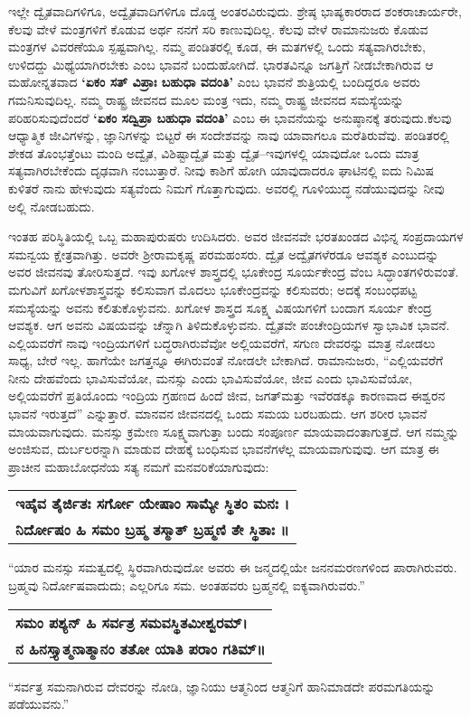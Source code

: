 ಇಲ್ಲೇ ದ್ವೈತವಾದಿಗಳಿಗೂ, ಅದ್ವೈತವಾದಿಗಳಿಗೂ ದೊಡ್ಡ ಅಂತರವಿರುವುದು. ಶ್ರೇಷ್ಠ ಭಾಷ್ಯಕಾರರಾದ ಶಂಕರಾಚಾರ್ಯರೇ, ಕೆಲವು ವೇಳೆ ಮಂತ್ರಗಳಿಗೆ ಕೊಡುವ ಅರ್ಥ ನನಗೆ ಸರಿ ಕಾಣುವುದಿಲ್ಲ. ಕೆಲವು ವೇಳೆ ರಾಮಾನುಜರು ಕೊಡುವ ಮಂತ್ರಗಳ ವಿವರಣೆಯೂ ಸ್ಪಷ್ಟವಾಗಿಲ್ಲ. ನಮ್ಮ ಪಂಡಿತರಲ್ಲಿ ಕೂಡ, ಈ ಮತಗಳಲ್ಲಿ ಒಂದು ಸತ್ಯವಾಗಿರಬೇಕು, ಉಳಿದದ್ದು ಮಿಥ್ಯೆಯಾಗಿರಬೇಕು ಎಂಬ ಭಾವನೆ ಬಂದುಹೋಗಿದೆ. ಭಾರತವಿನ್ನೂ ಜಗತ್ತಿಗೆ ನೀಡಬೇಕಾಗಿರುವ ಆ ಮಹೋನ್ನತವಾದ \textbf{‘ಏಕಂ ಸತ್​ ವಿಪ್ರಾಃ ಬಹುಧಾ ವದಂತಿ’} ಎಂಬ ಭಾವನೆ ಶುತ್ರಿಯಲ್ಲಿ ಬಂದಿದ್ದರೂ ಅವರು ಗಮನಿಸುವುದಿಲ್ಲ. ನಮ್ಮ ರಾಷ್ಟ್ರ ಜೀವನದ ಮೂಲ ಮಂತ್ರ ಇದು, ನಮ್ಮ ರಾಷ್ಟ್ರ ಜೀವನದ ಸಮಸ್ಯೆಯನ್ನು ಪರಿಹರಿಸುವುದೆಂದರೆ \textbf{‘ಏಕಂ ಸದ್ವಿಪ್ರಾ ಬಹುಧಾ ವದಂತಿ’} ಎಂಬ ಈ ಭಾವನೆಯನ್ನು ಅನುಷ್ಠಾನಕ್ಕೆ ತರುವುದು.\break ಕೆಲವು ಆಧ್ಯಾತ್ಮಿಕ ಜೀವಿಗಳನ್ನು, ಜ್ಞಾನಿಗಳನ್ನು ಬಿಟ್ಟರೆ ಈ ಸಂದೇಶವನ್ನು ನಾವು ಯಾವಾ\break ಗಲೂ ಮರೆತಿರುವೆವು. ಪಂಡಿತರಲ್ಲಿ ಶೇಕಡ ತೊಂಭತ್ತೆಂಟು ಮಂದಿ ಅದ್ವೈತ, ವಿಶಿಷ್ಟಾದ್ವೈತ ಮತ್ತು ದ್ವೈತ–ಇವುಗಳಲ್ಲಿ ಯಾವುದೋ ಒಂದು ಮಾತ್ರ ಸತ್ಯವಾಗಿರಬೇಕೆಂದು ದೃಢವಾಗಿ ನಂಬುತ್ತಾರೆ. ನೀವು ಕಾಶಿಗೆ ಹೋಗಿ ಯಾವುದಾದರೂ ಘಾಟಿನಲ್ಲಿ ಐದು ನಿಮಿಷ ಕುಳಿತರೆ ನಾನು ಹೇಳುವುದು ಸತ್ಯವೆಂದು ನಿಮಗೆ ಗೊತ್ತಾಗುವುದು. ಅವರಲ್ಲಿ ಗೂಳಿಯುದ್ಧ ನಡೆಯುವುದನ್ನು ನೀವು ಅಲ್ಲಿ ನೋಡಬಹುದು.

ಇಂತಹ ಪರಿಸ್ಥಿತಿಯಲ್ಲಿ ಒಬ್ಬ ಮಹಾಪುರುಷರು ಉದಿಸಿದರು. ಅವರ ಜೀವನವೇ ಭರತಖಂಡದ ವಿಭಿನ್ನ ಸಂಪ್ರದಾಯಗಳ ಸಮನ್ವಯ ಕ್ಷೇತ್ರವಾಗಿತ್ತು. ಅವರೇ ಶ‍್ರೀರಾಮಕೃಷ್ಣ ಪರಮಹಂಸರು. ದ್ವೈತ ಅದ್ವೈತಗಳೆರಡೂ ಆವಶ್ಯಕ ಎಂಬುದನ್ನು ಅವರ ಜೀವನವು ತೋರಿಸುತ್ತದೆ. ಇವು ಖಗೋಳ ಶಾಸ್ತ್ರದಲ್ಲಿ ಭೂಕೇಂದ್ರ  ಸೂರ್ಯಕೇಂದ್ರ  ವೆಂಬ ಸಿದ್ಧಾಂತಗಳಿರುವಂತೆ. ಮಗುವಿಗೆ ಖಗೋಳಶಾಸ್ತ್ರವನ್ನು ಕಲಿಸುವಾಗ ಮೊದಲು ಭೂಕೇಂದ್ರವನ್ನು ಕಲಿಸುವರು; ಅದಕ್ಕೆ ಸಂಬಂಧಪಟ್ಟ ಸಮಸ್ಯೆಯನ್ನು ಅವನು ಕಲಿತುಕೊಳ್ಳುವನು. ಖಗೋಳ ಶಾಸ್ತ್ರದ ಸೂಕ್ಷ್ಮ ವಿಷಯಗಳಿಗೆ ಬಂದಾಗ ಸೂರ್ಯ ಕೇಂದ್ರ ಆವಶ್ಯಕ. ಆಗ ಅವನು ವಿಷಯವನ್ನು ಚೆನ್ನಾಗಿ ತಿಳಿದುಕೊಳ್ಳುವನು. ದ್ವೈತವೇ ಪಂಚೇಂದ್ರಿಯಗಳ ಸ್ವಾಭಾವಿಕ ಭಾವನೆ. ಎಲ್ಲಿಯವರೆಗೆ ನಾವು ಇಂದ್ರಿಯಗಳಿಗೆ ಬದ್ಧರಾಗಿರುವೆವೋ ಅಲ್ಲಿಯವರೆಗೆ, ಸಗುಣ ದೇವರನ್ನು ಮಾತ್ರ ನೋಡಲು ಸಾಧ್ಯ, ಬೇರೆ ಇಲ್ಲ. ಹಾಗೆಯೇ ಜಗತ್ತನ್ನೂ ಈಗಿರುವಂತೆ ನೋಡಲೇ ಬೇಕಾಗಿದೆ. ರಾಮಾನುಜರು, “ಎಲ್ಲಿಯವರೆಗೆ ನೀನು ದೇಹವೆಂದು ಭಾವಿಸುವೆಯೋ, ಮನಸ್ಸು ಎಂದು ಭಾವಿಸುವೆಯೋ, ಜೀವ ಎಂದು ಭಾವಿಸುವೆಯೋ, ಅಲ್ಲಿಯವರೆಗೆ ಪ್ರತಿಯೊಂದು ಇಂದ್ರಿಯ ಗ್ರಹಣದ ಹಿಂದೆ ಜೀವ, ಜಗತ್​ ಮತ್ತು ಇವೆರಡಕ್ಕೂ ಕಾರಣವಾದ ಈಶ್ವರನ ಭಾವನೆ ಇರುತ್ತದೆ” ಎನ್ನುತ್ತಾರೆ. ಮಾನವನ ಜೀವನದಲ್ಲಿ ಒಂದು ಸಮಯ ಬರಬಹುದು. ಆಗ ಶರೀರ ಭಾವನೆ ಮಾಯವಾಗುವುದು. ಮನಸ್ಸು ಕ್ರಮೇಣ ಸೂಕ್ಷ್ಮವಾಗುತ್ತಾ ಬಂದು ಸಂಪೂರ್ಣ ಮಾಯವಾದಂತಾಗುತ್ತದೆ. ಆಗ ನಮ್ಮನ್ನು ಅಂಜಿಸುವ, ದುರ್ಬಲರನ್ನಾಗಿ ಮಾಡುವ ದೇಹಕ್ಕೆ ಬಂಧಿಸುವ ಭಾವನೆಗಳೆಲ್ಲ ಮಾಯವಾಗುವುವು. ಆಗ ಮಾತ್ರ ಈ ಪ್ರಾಚೀನ ಮಹಾಬೋಧನೆಯ ಸತ್ಯ ನಮಗೆ ಮನವರಿಕೆಯಾಗುವುದು:

\begin{longtable}[c]{@{}l@{}}
\textbf{{\small ಇಹೈವ ತೈರ್ಜಿತಃ ಸರ್ಗೋ ಯೇಷಾಂ ಸಾಮ್ಯೇ ಸ್ಥಿತಂ ಮನಃ ।}} \\
\textbf{{\small ನಿರ್ದೋಷಂ ಹಿ ಸಮಂ ಬ್ರಹ್ಮ ತಸ್ಮಾತ್​ ಬ್ರಹ್ಮಣಿ ತೇ ಸ್ಥಿತಾಃ ॥}} \\
\end{longtable}

“ಯಾರ ಮನಸ್ಸು ಸಮತ್ವದಲ್ಲಿ ಸ್ಥಿರವಾಗಿರುವುದೋ ಅವರು ಈ ಜನ್ಮದಲ್ಲಿಯೇ ಜನನಮರಣಗಳಿಂದ ಪಾರಾಗಿರುವರು. ಬ್ರಹ್ಮವು ನಿರ್ದೋಷವಾದುದು; ಎಲ್ಲರಿಗೂ ಸಮ. ಅಂತಹವರು ಬ್ರಹ್ಮನಲ್ಲಿ ಐಕ್ಯವಾಗಿರುವರು.”

\begin{longtable}[c]{@{}l@{}}
\textbf{{\small ಸಮಂ ಪಶ್ಯನ್​ ಹಿ ಸರ್ವತ್ರ ಸಮವಸ್ಥಿತಮೀಶ್ವರಮ್​ ।}} \\
\textbf{{\small ನ ಹಿನಸ್ತ್ಯಾತ್ಮನಾತ್ಮಾನಂ ತತೋ ಯಾತಿ ಪರಾಂ ಗತಿಮ್​ ॥}} \\
\end{longtable}

“ಸರ್ವತ್ರ ಸಮನಾಗಿರುವ ದೇವರನ್ನು ನೋಡಿ, ಜ್ಞಾನಿಯು ಆತ್ಮನಿಂದ ಆತ್ಮನಿಗೆ ಹಾನಿಮಾಡದೇ ಪರಮಗತಿಯನ್ನು ಪಡೆಯುವನು.”

